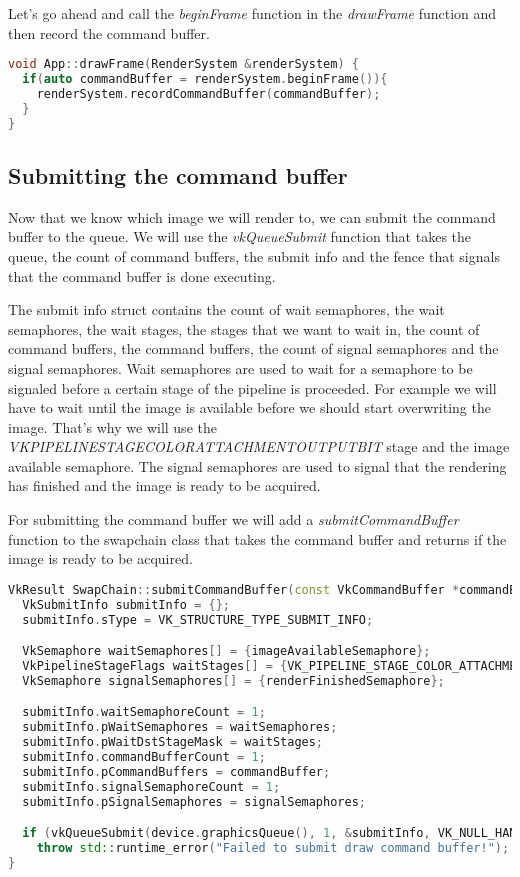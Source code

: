 \documentclass[12pt]{report} \usepackage{preamble}
\begin{document}
Let's go ahead and call the \textit{beginFrame} function in the \textit{drawFrame} function and then record the command buffer.

\begin{lstlisting}[language=C++]
void App::drawFrame(RenderSystem &renderSystem) {
  if(auto commandBuffer = renderSystem.beginFrame()){
    renderSystem.recordCommandBuffer(commandBuffer); 
  }
}
\end{lstlisting}

\subsection{Submitting the command buffer}

Now that we know which image we will render to, we can submit the command buffer to the queue. We will use the \textit{vkQueueSubmit}
function that takes the queue, the count of command buffers, the submit info and the fence that signals that the command buffer is done executing.

The submit info struct contains the count of wait semaphores, the wait semaphores, the wait stages, the stages that we want to wait in,
the count of command buffers, the command buffers, the count of signal semaphores and the signal semaphores. Wait semaphores are used to wait for
a semaphore to be signaled before a certain stage of the pipeline is proceeded. For example we will have to wait until the image is available
before we should start overwriting the image. That's why we will use the
\textit{VK\textunderscore PIPELINE\textunderscore STAGE\textunderscore COLOR\textunderscore ATTACHMENT\textunderscore OUTPUT\textunderscore BIT}
stage and the image available semaphore. The signal semaphores are used to signal that the rendering has finished and the image is ready to be
acquired.

For submitting the command buffer we will add a \textit{submitCommandBuffer} function to the swapchain class that takes the command buffer and returns
if the image is ready to be acquired.

\begin{lstlisting}[language=C++]
VkResult SwapChain::submitCommandBuffer(const VkCommandBuffer *commandBuffer, uint32_t *imageIndex) {
  VkSubmitInfo submitInfo = {};
  submitInfo.sType = VK_STRUCTURE_TYPE_SUBMIT_INFO;

  VkSemaphore waitSemaphores[] = {imageAvailableSemaphore};
  VkPipelineStageFlags waitStages[] = {VK_PIPELINE_STAGE_COLOR_ATTACHMENT_OUTPUT_BIT};
  VkSemaphore signalSemaphores[] = {renderFinishedSemaphore};

  submitInfo.waitSemaphoreCount = 1;
  submitInfo.pWaitSemaphores = waitSemaphores;
  submitInfo.pWaitDstStageMask = waitStages;
  submitInfo.commandBufferCount = 1;
  submitInfo.pCommandBuffers = commandBuffer;
  submitInfo.signalSemaphoreCount = 1;
  submitInfo.pSignalSemaphores = signalSemaphores;

  if (vkQueueSubmit(device.graphicsQueue(), 1, &submitInfo, VK_NULL_HANDLE) != VK_SUCCESS)
    throw std::runtime_error("Failed to submit draw command buffer!");
}
\end{lstlisting}
\end{document}
